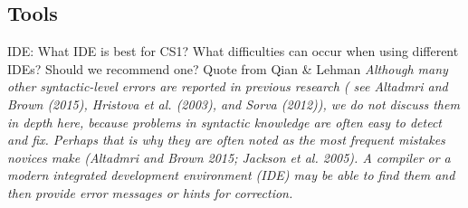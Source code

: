 \mode*
\subsection{Tools}

IDE: What IDE is best for CS1? What difficulties can occur when using 
different IDEs? Should we recommend one? Quote from Qian \& Lehman \emph{
Although many other syntactic-level errors are reported in previous research (
see Altadmri and Brown (2015), Hristova et al. (2003), and Sorva (2012)), we 
do not discuss them in depth here, because problems in syntactic knowledge 
are often easy to detect and fix. Perhaps that is why they are often noted as 
the most frequent mistakes novices make (Altadmri and Brown 2015; Jackson et 
al. 2005). A compiler or a modern integrated development environment (IDE) 
may be able to find them and then provide error messages or hints for 
correction.}

